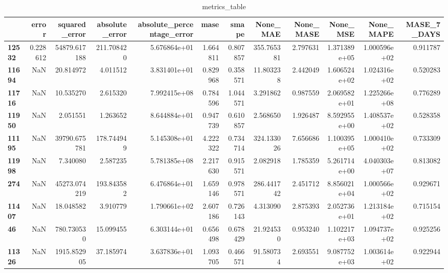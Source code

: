 \begin{table}[h]
\centering
\caption{metrics_table}
\label{table:Final tune for dataset 2 lstm global multivariate. After smape fix}
\begin{tabular}{lrrrrrrrrrrr}
\toprule
{} &     error &  squared\_error &  absolute\_error &  absolute\_percentage\_error &      mase &     smape &     None\_MAE &  None\_MASE &      None\_MSE &     None\_MAPE &  MASE\_7\_DAYS \\
\midrule
\textbf{12532} &  0.228612 &   54879.617188 &      211.708420 &               5.676864e+01 &  1.664811 &  0.807857 &   355.765381 &   2.797631 &  1.371389e+05 &  1.000596e+02 &     0.911787 \\
\textbf{11694} &       NaN &      20.814972 &        4.011512 &               3.831401e+01 &  0.829968 &  0.358571 &    11.803238 &   2.442049 &  1.606524e+02 &  1.024316e+02 &     0.520283 \\
\textbf{11716} &       NaN &      10.535270 &        2.615320 &               7.992415e+08 &  0.784596 &  1.044571 &     3.291862 &   0.987559 &  2.069582e+01 &  1.225266e+08 &     0.776289 \\
\textbf{11950} &       NaN &       2.051551 &        1.263652 &               8.644884e+01 &  0.947739 &  0.610857 &     2.568650 &   1.926487 &  8.592955e+00 &  1.408537e+02 &     0.528358 \\
\textbf{11195} &       NaN &   39790.675781 &      178.744949 &               5.145308e+01 &  4.222322 &  0.734714 &   324.133026 &   7.656686 &  1.100395e+05 &  1.000410e+02 &     0.733309 \\
\textbf{11998} &       NaN &       7.340080 &        2.587235 &               5.781385e+08 &  2.217630 &  0.915571 &     2.082918 &   1.785359 &  5.261714e+00 &  4.040303e+07 &     0.813082 \\
\textbf{274  } &       NaN &   45273.074219 &      193.843582 &               6.476864e+01 &  1.659146 &  0.978571 &   286.441742 &   2.451712 &  8.856021e+04 &  1.000566e+02 &     0.929671 \\
\textbf{11407} &       NaN &      18.048582 &        3.910779 &               1.790661e+02 &  2.607186 &  0.726143 &     4.313090 &   2.875393 &  2.052736e+01 &  1.213184e+02 &     0.715154 \\
\textbf{46   } &       NaN &     780.730530 &       15.099455 &               6.303144e+01 &  0.656498 &  0.678429 &    21.924530 &   0.953240 &  1.102217e+03 &  1.094737e+02 &     0.925256 \\
\textbf{11326} &       NaN &    1915.852905 &       37.185974 &               3.637836e+01 &  1.093705 &  0.466571 &    91.580734 &   2.693551 &  9.087752e+03 &  1.003614e+02 &     0.922944 \\

\end{tabular}
\end{table}
